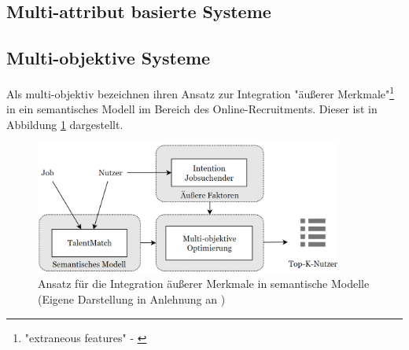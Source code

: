 
\subsection{Multi-attribut basierte Systeme}

\subsection{Multi-objektive Systeme}


Als multi-objektiv bezeichnen \textcite[S. 12]{rodriguez:inproceedings} ihren Ansatz zur Integration "äußerer Merkmale"\footnote{"extraneous features" - \textcite[S. 12]{rodriguez:inproceedings}} in ein semantisches Modell im Bereich des Online-Recruitments. 
Dieser ist in Abbildung \ref{fig:relatedwork:abb1} dargestellt.

\begin{figure}[H]
    \centering
	\includegraphics[width=0.9\textwidth]{gfx/talentMatch.png}
	\caption[Ansatz für die Integration äußerer Merkmale in semantische Modelle]{Ansatz für die Integration äußerer Merkmale in semantische Modelle\\
    (Eigene Darstellung in Anlehnung an \cite[S. 12]{rodriguez:inproceedings})}
	\label{fig:relatedwork:abb1}
\end{figure}

